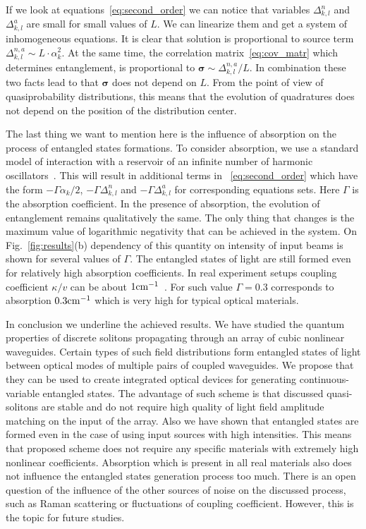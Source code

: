 \documentclass[9pt,twocolumn,twoside]{osajnl}
\begin{document}
If we look at equations~\eqref{eq:second_order} we can notice that  variables $\Delta^{n}_{k,l}$ and $\Delta^{a}_{k,l}$ are small for small values of $L$.
We can linearize them and get a system of inhomogeneous equations.
It is clear that solution is proportional to source term $\Delta^{n,a}_{k,l}\sim L \cdot \alpha^2_k$. 
At the same time, the correlation matrix~\eqref{eq:cov_matr} which determines entanglement, is proportional to $\bm{\sigma}\sim \Delta^{n,a}_{k,l}/L$.
In combination these two facts lead to that $\bm{\sigma}$ does not depend on $L$. 
From the point of view of quasiprobability distributions, this means that the evolution of quadratures does not depend on the position of the distribution center.
\par
The last thing we want to mention here is the influence of absorption on the process of entangled states formations.
To consider absorption, we use a standard model of interaction with   a reservoir of an infinite number of harmonic oscillators~\cite{drummond_quantum_2014}.
This will result in additional terms in ~\eqref{eq:second_order} which have the form $-\Gamma \alpha_k / 2$, $-\Gamma \Delta^{n}_{k,l}$ and $-\Gamma \Delta^{a}_{k,l}$ for corresponding equations sets. 
Here $\Gamma$ is the absorption coefficient.
In the presence of absorption, the evolution of entanglement remains qualitatively the same.
The only thing that changes is the maximum value of logarithmic negativity that can be achieved in the system.
On Fig.~\ref{fig:results}(b) dependency of this quantity on intensity of input beams is shown for several values of $\Gamma$.
The entangled states of light are still formed even for relatively high absorption coefficients. 
In real experiment setups coupling coefficient $\kappa/v$ can be about  $1 \rm{cm}^{-1}$~\cite{solntsev_generation_2014}.
For such value $\Gamma=0.3$ corresponds to absorption $0.3 \rm{cm}^{-1}$ which is very high for typical optical materials.
\par
In conclusion we underline the achieved results.
We have studied the quantum properties of discrete solitons propagating through an array of cubic nonlinear waveguides.
Certain types of such field distributions form entangled states of light between optical modes of multiple pairs of coupled waveguides.
We propose that they can be used to create integrated optical devices for generating continuous-variable entangled states.
The advantage of such scheme is that discussed quasi-solitons are stable and do not require high quality of light field amplitude matching on the input of the array.
Also we have shown that entangled states are formed even in the case of using input sources with high intensities.
This means that proposed scheme does not require any specific materials with extremely high nonlinear coefficients.
Absorption which is present in all real materials also does not influence the entangled states generation process too much. 
There is an open question of the influence of the other sources of noise on the discussed process, such as Raman scattering or fluctuations of coupling coefficient.
However, this is the topic for future studies.
\end{document}
